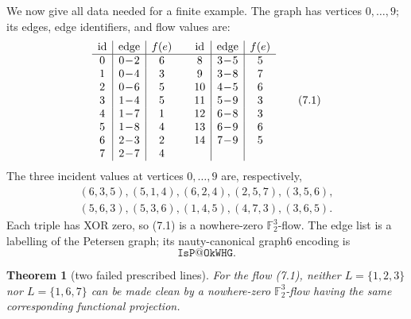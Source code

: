 \documentclass[11pt]{article}
\newtheorem{theorem}{Theorem}[section]
\theoremstyle{definition}
\theoremstyle{remark}
\newcommand{\F}{\mathbb F}
\begin{document}
We now give all data needed for a finite example.  The graph has vertices
\(0,\ldots,9\); its edges, edge identifiers, and flow values are:
\[
\begin{array}{c|c|c@{\qquad}c|c|c}
\text{id}&\text{edge}&f(e)&\text{id}&\text{edge}&f(e)\\ \hline
0&0\!-\!2&6&8&3\!-\!5&5\\
1&0\!-\!4&3&9&3\!-\!8&7\\
2&0\!-\!6&5&10&4\!-\!5&6\\
3&1\!-\!4&5&11&5\!-\!9&3\\
4&1\!-\!7&1&12&6\!-\!8&3\\
5&1\!-\!8&4&13&6\!-\!9&6\\
6&2\!-\!3&2&14&7\!-\!9&5\\
7&2\!-\!7&4&&&
\end{array}                                             \tag{7.1}
\]
The three incident values at vertices \(0,\ldots,9\) are, respectively,
\[
\begin{gathered}
(6,3,5),(5,1,4),(6,2,4),(2,5,7),(3,5,6),\\
(5,6,3),(5,3,6),(1,4,5),(4,7,3),(3,6,5).
\end{gathered}                                           \tag{7.2}
\]
Each triple has XOR zero, so (7.1) is a nowhere-zero
\(\F_2^3\)-flow.  The edge list is a labelling of the Petersen graph;
its nauty-canonical graph6 encoding is
\[
                            \texttt{IsP@OkWHG}.
\]

\begin{theorem}[two failed prescribed lines]\label{thm:petersen}
For the flow (7.1), neither \(L=\{1,2,3\}\) nor
\(L=\{1,6,7\}\) can be made clean by a nowhere-zero
\(\F_2^3\)-flow having the same corresponding functional projection.
\end{theorem}
\end{document}
